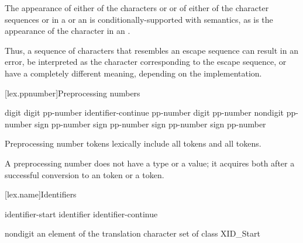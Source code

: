 \pnum
The appearance of either of the characters  or \tcode{\textbackslash} or of
either of the character sequences \tcode{/*} or \tcode{//} in a
 or an 
is conditionally-supported with  semantics, as is the appearance of the character
 in an .
\begin{footnote}
Thus, a sequence of characters
that resembles an escape sequence can result in an error, be interpreted as the
character corresponding to the escape sequence, or have a completely different meaning,
depending on the implementation.
\end{footnote}

[lex.ppnumber]{Preprocessing numbers}

%
\begin{bnf}
\br
    digit\br
     digit\br
    pp-number identifier-continue\br
    pp-number  digit\br
    pp-number  nondigit\br
    pp-number  sign\br
    pp-number  sign\br
    pp-number  sign\br
    pp-number  sign\br
    pp-number 
\end{bnf}

\pnum
Preprocessing number tokens lexically include
all  tokens and
all  tokens.

\pnum
A preprocessing number does not have a type or a value; it acquires both
after a successful conversion to
an  token or
a  token.%

[lex.name]{Identifiers}

%
\begin{bnf}
\br
    identifier-start\br
    identifier identifier-continue\br
\end{bnf}

\begin{bnf}
\br
    nondigit\br
    \textnormal{an element of the translation character set of class XID_Start}
\end{bnf}

